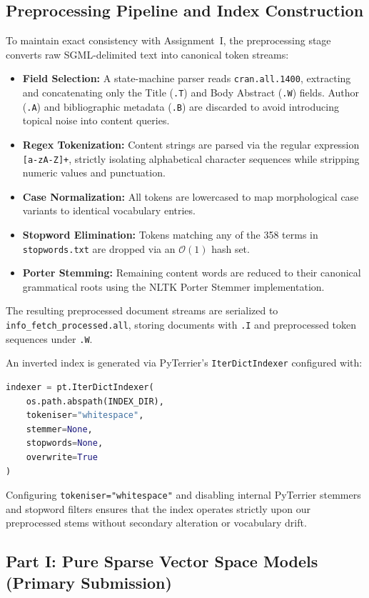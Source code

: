 \documentclass[10pt, a4paper]{article}
\begin{document}
\subsection{Preprocessing Pipeline and Index Construction}
To maintain exact consistency with Assignment~I, the preprocessing stage converts raw SGML-delimited text into canonical token streams:
\begin{itemize}[noitemsep,topsep=2pt]
    \item \textbf{Field Selection:} A state-machine parser reads \texttt{cran.all.1400}, extracting and concatenating only the Title (\texttt{.T}) and Body Abstract (\texttt{.W}) fields. Author (\texttt{.A}) and bibliographic metadata (\texttt{.B}) are discarded to avoid introducing topical noise into content queries.
    \item \textbf{Regex Tokenization:} Content strings are parsed via the regular expression \texttt{[a-zA-Z]+}, strictly isolating alphabetical character sequences while stripping numeric values and punctuation.
    \item \textbf{Case Normalization:} All tokens are lowercased to map morphological case variants to identical vocabulary entries.
    \item \textbf{Stopword Elimination:} Tokens matching any of the 358 terms in \texttt{stopwords.txt} are dropped via an $\mathcal{O}(1)$ hash set.
    \item \textbf{Porter Stemming:} Remaining content words are reduced to their canonical grammatical roots using the NLTK Porter Stemmer implementation.
\end{itemize}

The resulting preprocessed document streams are serialized to \texttt{info\_fetch\_processed.all}, storing documents with \texttt{.I} and preprocessed token sequences under \texttt{.W}. 

An inverted index is generated via PyTerrier's \texttt{IterDictIndexer} configured with:
\begin{lstlisting}[language=Python]
indexer = pt.IterDictIndexer(
    os.path.abspath(INDEX_DIR),
    tokeniser="whitespace",
    stemmer=None,
    stopwords=None,
    overwrite=True
)
\end{lstlisting}
Configuring \texttt{tokeniser="whitespace"} and disabling internal PyTerrier stemmers and stopword filters ensures that the index operates strictly upon our preprocessed stems without secondary alteration or vocabulary drift.

\subsection{Part I: Pure Sparse Vector Space Models (Primary Submission)}
\label{sec:impl_part1}
\end{document}
